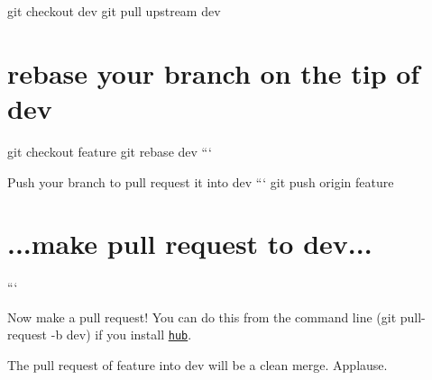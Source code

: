 git checkout dev git pull upstream dev \section*{rebase your branch on the tip of dev}

git checkout feature git rebase dev ```

Push your branch to pull request it into {\ttfamily dev} ``` git push origin feature \section*{...make pull request to dev...}

```

Now make a pull request! You can do this from the command line ({\ttfamily git pull-\/request -\/b dev}) if you install \href{https://github.com/github/hub}{\tt hub}.

The pull request of {\ttfamily feature} into {\ttfamily dev} will be a clean merge. Applause. 